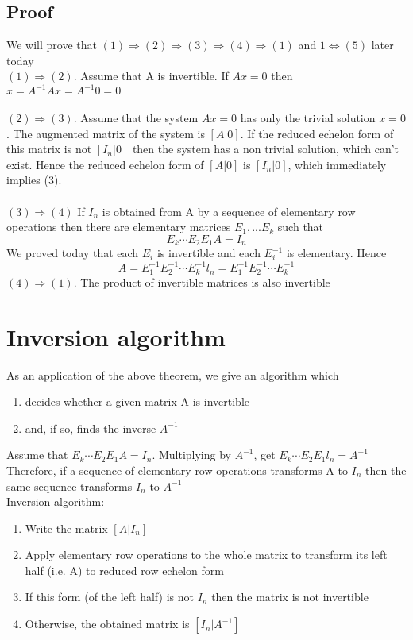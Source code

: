 \documentclass{article}[18pt]
\begin{document}
\subsection{Proof}
We will prove that $(1)\Rightarrow(2)\Rightarrow(3)\Rightarrow(4)\Rightarrow (1)$ and $1\Leftrightarrow (5)$ later today\\
$(1)\Rightarrow (2)$. Assume that A is invertible. If $Ax=0$ then $x=A^{-1}Ax=A^{-1}0=0$\\
\\
$(2)\Rightarrow (3)$. Assume that the system $Ax=0$ has only the trivial solution $x=0$. The augmented matrix of the system is $[A|0]$. If the reduced echelon form of this matrix is not $[I_n|0]$ then the system has a non trivial solution, which can't exist. Hence the reduced echelon form of $[A|0]$ is $[I_n|0]$, which immediately implies (3).\\
\\
$(3)\Rightarrow (4)$ If $I_n$ is obtained from A by a sequence of elementary row operations then there are elementary matrices $E_1,...E_k$ such that
$$E_k\cdots E_2E_1A=I_n$$
We proved today that each $E_i$ is invertible and each $E^{-1}_i$ is elementary. Hence
$$A = E _ { 1 } ^ { - 1 } E _ { 2 } ^ { - 1 } \cdots E _ { k } ^ { - 1 } l _ { n } = E _ { 1 } ^ { - 1 } E _ { 2 } ^ { - 1 } \cdots E _ { k } ^ { - 1 }$$
$(4)\Rightarrow (1)$. The product of invertible matrices is also invertible
\section{Inversion algorithm}
As an application of the above theorem, we give an algorithm which
\begin{enumerate}
	\item decides whether a given matrix A is invertible
	\item and, if so, finds the inverse $A^{-1}$
\end{enumerate}
Assume that $E_k\cdots E_2E_1A=I_n$. Multiplying by $A^{-1}$, get $E _ { k } \cdots E _ { 2 } E _ { 1 } l _ { n } = A ^ { - 1 }$\\
Therefore, if a sequence of elementary row operations transforms A to $I_n$ then the same sequence transforms $I_n$ to $A^{-1}$\\
Inversion algorithm:
\begin{enumerate}
	\item Write the matrix $[A|I_n]$
	\item Apply elementary row operations to the whole matrix to transform its left half  (i.e. A) to reduced row echelon form
	\item If this form (of the left half) is not $I_n$ then the matrix is not invertible
	\item Otherwise, the obtained matrix is $[I_n|A^{-1}]$
\end{enumerate}
\newpage
\end{document}
